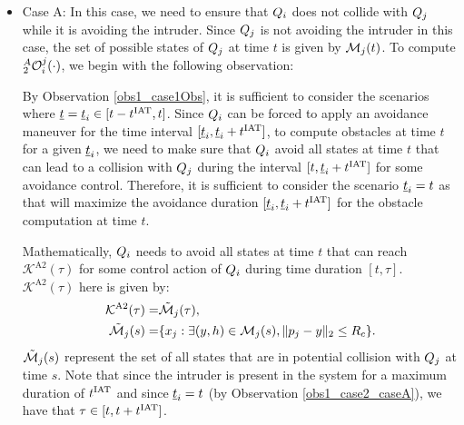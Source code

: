 \begin{itemize}[leftmargin=*] 
\item \label{sec:intruderObs_case2_caseA} Case A: In this case, we need to ensure that $Q_i$ does not collide with $Q_j$ while it is avoiding the intruder. Since $Q_j$ is not avoiding the intruder in this case, the set of possible states of $Q_j$ at time $t$ is given by $\mathcal{M}_j(t)$. To compute $_2^A\mathcal{O}_i^j(\cdot)$, we begin with the following observation: 
\begin{observation} \label{obs1_case2_caseA}
By Observation \ref{obs1_case1Obs}, it is sufficient to consider the scenarios where $\underline{t} = \underline{t}_i \in [t-t^\text{IAT}, t]$. Since $Q_i$ can be forced to apply an avoidance maneuver for the time interval $[\underline{t}_i, \underline{t}_i+t^\text{IAT}]$, to compute obstacles at time $t$ for a given $\underline{t}_i$, we need to make sure that $Q_i$ avoid all states at time $t$ that can lead to a collision with $Q_j$ during the interval $[t, \underline{t}_i+t^\text{IAT}]$ for some avoidance control. Therefore, it is sufficient to consider the scenario $\underline{t}_i = t$ as that will maximize the avoidance duration $[\underline{t}_i, \underline{t}_i+t^\text{IAT}]$ for the obstacle computation at time $t$.  
\end{observation}

Mathematically, $Q_i$ needs to avoid all states at time $t$ that can reach $\mathcal{K}^{\text{A2}}(\tau)$ for some control action of $Q_i$ during time duration $[t, \tau]$. $\mathcal{K}^{\text{A2}}(\tau)$ here is given by:
\begin{equation}
\begin{aligned}
\mathcal{K}^{\text{A2}}(\tau) = & \tilde{\mathcal{M}}_j(\tau),\\
\tilde{\mathcal{M}}_j(s) = & \{x_j: \exists (y, h) \in \mathcal{M}_j(s), \|p_j - y\|_2 \le R_c \}.
\end{aligned}
\end{equation}
$\tilde{\mathcal{M}}_j(s)$ represent the set of all states that are in potential collision with $Q_j$ at time $s$. Note that since the intruder is present in the system for a maximum duration of $t^\text{IAT}$ and since $\underline{t}_i = t$ (by Observation \ref{obs1_case2_caseA}), we have that $\tau \in [t, t+t^\text{IAT}]$. 


\end{itemize}
